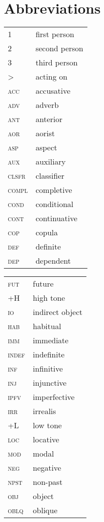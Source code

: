 \documentclass[output=paper]{langsci/langscibook}
\begin{document}
\section*{Abbreviations}

 

\begin{tabularx}{.3\textwidth}{ll}
1 & first person\\
2 & second person\\
3 & third person\\
>  & acting on  \\
\textsc{acc}  & accusative\\  
\textsc{adv}   & adverb\\
\textsc{ant}   & anterior \\
\textsc{aor}   & aorist\\  
\textsc{asp}   & aspect\\
\textsc{aux}   & auxiliary  \\
\textsc{clsfr}   & classifier  \\
\textsc{compl}   & completive\\
\textsc{cond}   & conditional  \\
\textsc{cont}   & continuative  \\
\textsc{cop}   & copula\\
\textsc{def}   & definite\\  
\textsc{dep}   & dependent \\ 
\end{tabularx} 
\begin{tabularx}{.3\textwidth}{ll}
\textsc{fut}   & future\\
\textsc{+H}   & high tone\\  
\textsc{io}  & indirect object  \\
\textsc{hab}   & habitual  \\
\textsc{imm}  & immediate\\
\textsc{indef}  & indefinite\\  
\textsc{inf}  & infinitive  \\
\textsc{inj}  & injunctive  \\
\textsc{ipfv}  & imperfective  \\
\textsc{irr}   & irrealis  \\
\textsc{+L}  & low tone  \\
\textsc{loc}  & locative  \\
\textsc{mod}  & modal  \\
\textsc{neg}  & negative  \\
\textsc{npst}  & non-past \\
\textsc{obj}  & object  \\
\textsc{oblq}  & oblique  \\
\end{tabularx} 
\end{document}
